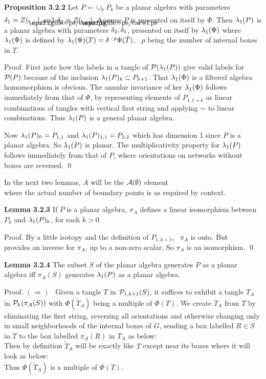 \bs\ni
{\bf Proposition 3.2.2} Let $P=\cup_k P_k$ be a planar algebra
with parameters $\d_1=Z(\caright)$ and
$\d_2=Z(\caleft)$. Assume $P$ is presented on itself by
$\Phi$. Then $\lambda_1(P)$ is a planar algebra with parameters
$\delta_2,\delta_1$, presented on itself by $\lambda_1(\Phi)$ where $\lambda_1(\Phi)$
is defined by $\lambda_1(\Phi)(T)=\delta^{-p}\Phi(\tilde T)$, \ $p$ being
the number of internal boxes in $T$.

\bs
{\sc Proof.} First note how  the labels in a tangle of
${\cal P}(\lambda_1(P))$ give valid labels for ${\cal P}(P)$ because of the
inclusion $\lambda_1(P)_k\subset P_{k+1}$. That $\lambda_1(\Phi)$ is a
filtered algebra homomorphism is obvious. The annular invariance of
ker $\lambda_1(\Phi)$ follows immediately from that of $\Phi$, by
representing elements of $P_{1,1+k}$ as linear combinations of
tangles with vertical first string and applying $\sim$ to linear
combinations. Thus $\lambda_1(P)$ is a general planar algebra.

Now $\lambda_1(P)_0=P_{1,1}$ and $\lambda_1(P)_{1,1}=P_{2,2}$ which has
dimension 1 since $P$ is a planar algebra. So
$\lambda_1(P)$ is planar. The multiplicativity property for $\lambda_1(P)$
follows immediately from that of $P$, where orientations on
networks without boxes are reversed. \qed

\bs In the next two lemmas, $A$ will be the ${\cal A}(\emptyset)$
element
\[
	
\]
\ni where the actual number of boundary points is as required by
context.

\bs\ni
{\bf Lemma 3.2.3} If $P$ is a planar algebra, $\pi_A$ defines
a linear isomorphism between $P_k$ and $\lambda_1(P)_k$, for each $k >0$.

\bigskip
{\sc Proof.} By a little isotopy and the definition of
$P_{1,k+1}$, \ $\pi_A$ is onto. But
\[
	
\]
\ni provides an inverse for $\pi_A$, up to a non-zero scalar.
So $\pi_A$ is an isomorphism. \qed


{\bf Lemma 3.2.4} The subset $S$ of the planar algebra
generates $P$ as a planar algebra iff $\pi_A(S)$ generates
$\lambda_1(P)$ as a planar algebra.

\bigskip
{\sc Proof.} $(\Rightarrow)$ \  Given a tangle $T$ in
${\cal P}_{1,k+1}(S)$, it suffices to exhibit a tangle $T_A$
in ${\cal P}_k(\pi_A(S))$ with $\Phi(\tilde T_A)$ being a multiple of
$\Phi(T)$. We create $T_A$ from $T$ by eliminating the first
string, reversing all orientations and otherwise changing only in
small neighborhoods of the internal boxes of $G$, sending a box
labelled $R\in S$ in $T$ to the box labelled $\pi_A(R)$ in $T_A$ as
below:
\[
	
\]
Then by definition $\tilde T_A$ will be exactly like $T$ except
near its boxes where it will look as below:
\[
	
\]
\ni Thus $\Phi(\tilde T_A)$ is a multiple of $\Phi(T)$.


